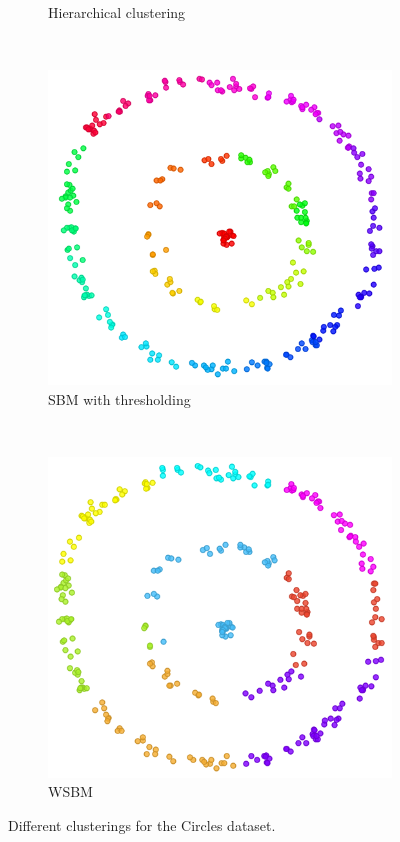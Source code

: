 \documentclass[conference]{IEEEtran}
\begin{document}
\begin{figure}[H]
\begin{subfigure}[c]{0.48\columnwidth}
        \caption{Hierarchical clustering}
        \label{fig:synthetic_circles}
    \end{subfigure}
    ~
    \begin{subfigure}[c]{0.48\columnwidth}
        \includegraphics[width=\columnwidth]{results/circular_sbm.png}
        \caption{SBM with thresholding}
        \label{fig:synthetic_ina}
    \end{subfigure}
    ~
    \begin{subfigure}[c]{0.48\columnwidth}
        \includegraphics[width=\columnwidth]{results/circular_wsbm.png}
        \caption{WSBM}
        \label{fig:synthetic_ina}
    \end{subfigure}
    \caption{Different clusterings for the Circles dataset.}\label{fig:results_circular}
\end{figure}
\end{document}
